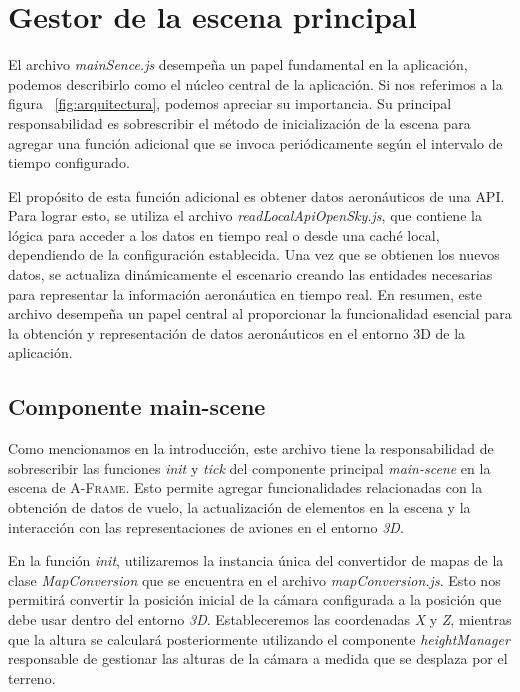 \documentclass[a4paper, 11pt]{book}
\begin{document}
\section{Gestor de la escena principal}
\label{sec:mainScene.js}
El archivo \emph{mainSence.js} desempeña un papel fundamental en la aplicación, podemos describirlo como el núcleo central de la aplicación. Si nos referimos a la figura ~\ref{fig:arquitectura}, podemos apreciar su importancia. Su principal responsabilidad es sobrescribir el método de inicialización de la escena para agregar una función adicional que se invoca periódicamente según el intervalo de tiempo configurado.

El propósito de esta función adicional es obtener datos aeronáuticos de una \textsc{API}. Para lograr esto, se utiliza el archivo \emph{readLocalApiOpenSky.js}, que contiene la lógica para acceder a los datos en tiempo real o desde una caché local, dependiendo de la configuración establecida. Una vez que se obtienen los nuevos datos, se actualiza dinámicamente el escenario creando las entidades necesarias para representar la información aeronáutica en tiempo real.
En resumen, este archivo desempeña un papel central al proporcionar la funcionalidad esencial para la obtención y representación de datos aeronáuticos en el entorno \textsc{3D} de la aplicación.

\subsection{Componente main-scene}
\label{sec:mainScene}
Como mencionamos en la introducción, este archivo tiene la responsabilidad de sobrescribir las funciones \emph{init} y \emph{tick} del componente principal \emph{main-scene} en la escena de \textsc{A-Frame}. Esto permite agregar funcionalidades relacionadas con la obtención de datos de vuelo, la actualización de elementos en la escena y la interacción con las representaciones de aviones en el entorno \emph{\gls{3D}}.

En la función \emph{init}, utilizaremos la instancia única del convertidor de mapas de la clase \emph{MapConversion} que se encuentra en el archivo \emph{mapConversion.js}. Esto nos permitirá convertir la posición inicial de la cámara configurada a la posición que debe usar dentro del entorno \emph{3D}. Estableceremos las coordenadas \emph{X} y \emph{Z}, mientras que la altura se calculará posteriormente utilizando el componente \emph{heightManager} responsable de gestionar las alturas de la cámara a medida que se desplaza por el terreno.
\end{document}
